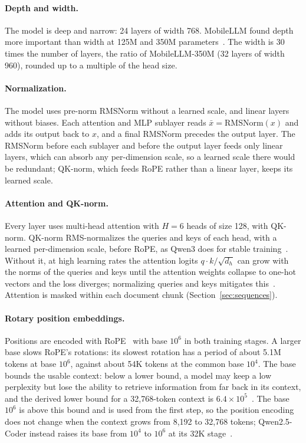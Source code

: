 \documentclass[sigconf,nonacm,balance=false]{acmart}
\begin{document}
\paragraph{Depth and width.} The model is deep and narrow: 24 layers of width 768. MobileLLM found depth more
important than width at 125M and 350M parameters~\cite{liu2024mobilellm}. The width is 30 times the number of layers,
the ratio of MobileLLM-350M (32 layers of width 960), rounded up to a multiple of the head size.

\paragraph{Normalization.} The model uses pre-norm RMSNorm without a learned scale, and linear layers without biases.
Each attention and MLP sublayer reads $\bar{x} = \mathrm{RMSNorm}(x)$ and adds its output back to $x$, and a final
RMSNorm precedes the output layer. The RMSNorm before each sublayer and
before the output layer feeds only linear layers, which can absorb any per-dimension scale, so a learned scale there
would be redundant; QK-norm, which feeds RoPE rather than a linear layer, keeps its learned scale.

\paragraph{Attention and QK-norm.} Every layer uses multi-head attention with $H = 6$ heads of size 128, with QK-norm.
QK-norm RMS-normalizes the queries and keys of each head, with a learned per-dimension scale, before RoPE, as Qwen3 does
for stable training~\cite{yang2025qwen3}. Without it, at high learning rates the attention logits
$q \cdot k / \sqrt{d_h}$ can grow with the norms of the queries and keys until the attention weights collapse to
one-hot vectors and the loss diverges; normalizing queries and keys mitigates this~\cite{wortsman2023smallscale}.
Attention is masked within each document chunk (Section~\ref{sec:sequences}).

\paragraph{Rotary position embeddings.} Positions are encoded with RoPE~\cite{men2024ropebase} with base $10^6$ in both
training stages. A larger base slows RoPE's rotations: its slowest rotation has a period of about 5.1M tokens at base
$10^6$, against about 54K tokens at the common base $10^4$. The base bounds the usable context: below a lower bound, a
model may keep a low perplexity but lose the ability to retrieve information from far back in its context, and the
derived lower bound for a 32,768-token context is $6.4 \times 10^5$~\cite{men2024ropebase}. The base $10^6$ is above
this bound and is used from the first step, so the
position encoding does not change when the context grows from 8,192 to 32,768 tokens; Qwen2.5-Coder instead raises
its base from $10^4$ to $10^6$ at its 32K stage~\cite{hui2024qwen25coder}.
\end{document}

